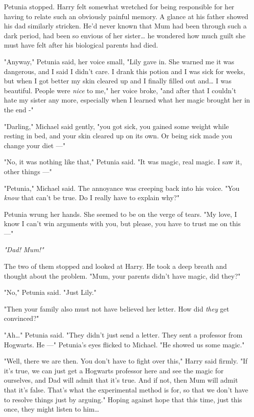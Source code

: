 Petunia stopped. Harry felt somewhat wretched for being
responsible for her having to relate such an obviously
painful memory. A glance at his father showed his dad
similarly stricken. He'd never known that Mum had been
through such a dark period, had been so envious of her
sister{\ldots} he wondered how much guilt she must have felt
after his biological parents had died.

"Anyway," Petunia said, her voice small, "Lily gave in. She
warned me it was dangerous, and I said I didn't care. I
drank this potion and I was sick for weeks, but when I
got better my skin cleared up and I finally filled out and{\ldots}
I was beautiful. People were \emph{nice} to me," her voice broke,
"and after that I couldn't hate my sister any more,
especially when I learned what her magic brought her in
the end -"

"Darling," Michael said gently, "you got sick, you gained
some weight while resting in bed, and your skin cleared up
on its own. Or being sick made you change your diet ---"

"No, it was nothing like that," Petunia said. "It was magic,
real magic. I saw it, other things ---"

"Petunia," Michael said. The annoyance was creeping back
into his voice. "You \emph{know} that can't be true. Do I really
have to explain why?"

Petunia wrung her hands. She seemed to be on the verge
of tears. "My love, I know I can't win arguments with you,
but please, you have to trust me on this ---"

\emph{"Dad! Mum!"}

The two of them stopped and looked at Harry. He took a
deep breath and thought about the problem. "Mum, your
parents didn't have magic, did they?"

"No," Petunia said. "Just Lily."

"Then your family also must not have believed her letter.
How did \emph{they} get convinced?"

"Ah{\ldots}" Petunia said. "They didn't just send a letter. They
sent a professor from Hogwarts. He ---" Petunia's eyes
flicked to Michael. "He showed us some magic."

"Well, there we are then. You don't have to fight over
this," Harry said firmly. "If it's true, we can just get a
Hogwarts professor here and see the magic for ourselves,
and Dad will admit that it's true. And if not, then Mum will
admit that it's false. That's what the experimental method
is for, so that we don't have to resolve things just by
arguing." Hoping against hope that this time, just this once,
they might listen to him{\ldots}

